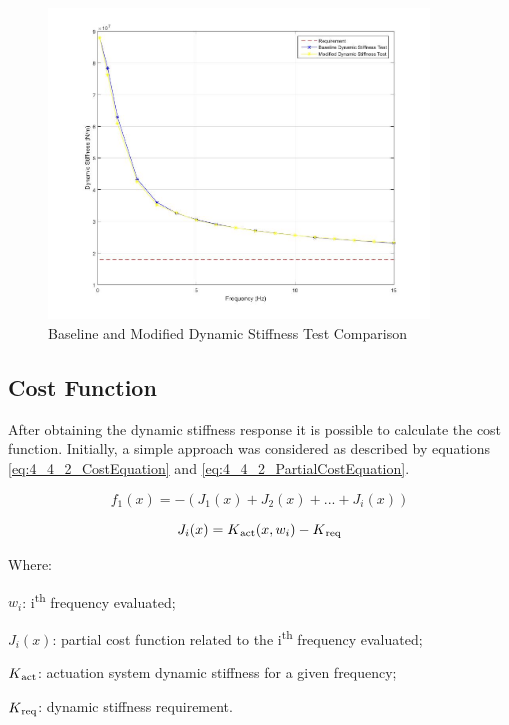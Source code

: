 \begin{figure}[H]
	\centering
	\centerline{\includegraphics[width=0.9\textwidth]{Figuras/4.DynamicStifinessOptimizationAlgorithm/4-4-1-DynamicStiffnessComparison.jpg}}
	\caption{Baseline and Modified Dynamic Stiffness Test Comparison}
	\label{fig:4_4_1_DynamicStiffnessComparison}
\end{figure}

\subsection{Cost Function} \label{4-3-2-CostEquation}

After obtaining the dynamic stiffness response it is possible to calculate the cost function. Initially, a simple approach was considered as described by equations \ref{eq:4_4_2_CostEquation} and \ref{eq:4_4_2_PartialCostEquation}.

\begin{equation}
\label{eq:4_4_2_CostEquation}
f_1(x) = -( J_1(x) + J_2(x) + ... + J_i(x))
\end{equation} 

\begin{equation}
\label{eq:4_4_2_PartialCostEquation}
J_i(x) = K\textsubscript{act}(x,w_i) - K\textsubscript{req}
\end{equation} 

Where:

\begin{description}
	\item \hspace{20pt}$w_i$: i\textsuperscript{th} frequency evaluated;
	\item \hspace{20pt}$J_i(x)$: partial cost function related to the i\textsuperscript{th} frequency evaluated;
	\item \hspace{20pt}$K\textsubscript{act}$: actuation system dynamic stiffness for a given frequency;
	\item \hspace{20pt}$K\textsubscript{req}$: dynamic stiffness requirement.
\end{description}

